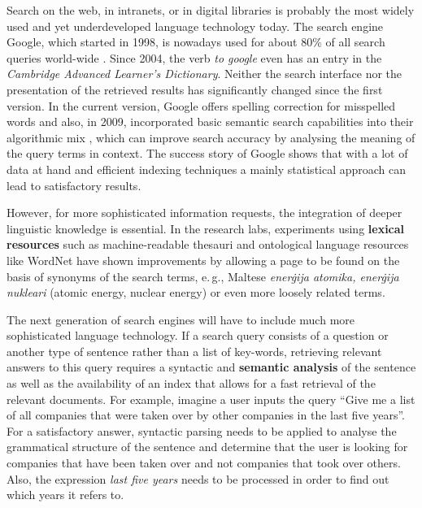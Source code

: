 \begin{multicols}{2}
Search on the web, in intranets, or in digital libraries is probably the most widely used and yet underdeveloped language technology today. The search engine Google, which started in 1998, is nowadays used for about 80\% of all search queries world-wide \cite{spi1}. Since 2004, the verb \emph{to google} even has an entry in the \emph{Cambridge Advanced Learner’s Dictionary}. Neither the search interface nor the presentation of the retrieved results has significantly changed since the first version. 
In the current version, Google offers spelling correction for misspelled words and also, in 2009, incorporated basic semantic search capabilities into their algorithmic mix \cite{pc1}, which can improve search accuracy by analysing the meaning of the query terms in context. The success story of Google shows that with a lot of data at hand and efficient indexing techniques a mainly statistical approach can lead to satisfactory results.  

However, for more sophisticated information requests, the integration of deeper linguistic knowledge is essential. In the research labs, experiments using \textbf{lexical resources} such as machine-readable thesauri and ontological language resources like WordNet have shown improvements by allowing a page to be found on the basis of synonyms of the search terms, e.\,g., Maltese \emph{enerġija atomika, enerġija nukleari} (atomic energy, nuclear energy) or even more loosely related terms.


The next generation of search engines will have to include much more sophisticated language technology. If a search query consists of a question or another type of sentence rather than a list of key-words, retrieving relevant answers to this query requires a syntactic and \textbf{semantic analysis} of the sentence as well as the availability of an index that allows for a fast retrieval of the relevant documents. For example, imagine a user inputs the query ``Give me a list of all companies that were taken over by other companies in the last five years''. For a satisfactory answer, syntactic parsing needs to be applied to analyse the grammatical structure of the sentence and determine that the user is looking for companies that have been taken over and not companies that took over others. Also, the expression \emph{last five years} needs to be processed in order to find out which years it refers to. 


\end{multicols}
